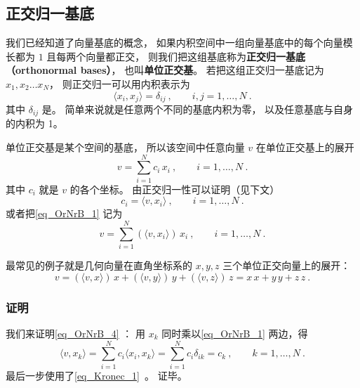 
\begin{issues}
\issueTODO
\end{issues}



\subsection{正交归一基底}

我们已经知道了向量基底的概念， 如果内积空间中一组向量基底中的每个向量模长都为 $1$ 且每两个向量都正交， 则我们把这组基底称为\textbf{正交归一基底（orthonormal bases）}， 也叫\textbf{单位正交基}。 若把这组正交归一基底记为 $x_1, x_2 \dots x_N$， 则正交归一可以用内积表示为
\begin{equation}\label{eq_OrNrB_3}
\langle x_i, x_j \rangle = \delta_{ij} ~,\qquad i,j = 1,\dots, N~.
\end{equation}
其中 $\delta_{ij}$ 是。 简单来说就是任意两个不同的基底内积为零， 以及任意基底与自身的内积为 1。

单位正交基是某个空间的基底， 所以该空间中任意向量 $v$ 在单位正交基上的展开
\begin{equation}\label{eq_OrNrB_1}
v = \sum_{i = 1}^N c_i \, x_i ~,\qquad i = 1, \dots, N~.
\end{equation}
其中 $c_i$ 就是 $v$ 的各个坐标。 由正交归一性可以证明（见下文）
\begin{equation}\label{eq_OrNrB_4}
c_i = \langle v, x_i \rangle ~,\qquad i = 1, \dots, N~.
\end{equation}
或者把\autoref{eq_OrNrB_1} 记为
\begin{equation}\label{eq_OrNrB_5}
v = \sum_{i = 1}^N (\langle v, x_i \rangle) \, x_i~, \qquad i = 1, \dots, N~.
\end{equation}

最常见的例子就是几何向量在直角坐标系的 $x, y, z$ 三个单位正交向量上的展开：
\begin{equation}
v = (\langle v, x \rangle)\, x + (\langle v, y \rangle)\, y + (\langle v, z \rangle)\, z = x \, x + y \, y + z \, z~.
\end{equation} 

\subsubsection{证明}
我们来证明\autoref{eq_OrNrB_4} ： 用 $x_k$ 同时乘以\autoref{eq_OrNrB_1} 两边，得
\begin{equation}\label{eq_OrNrB_2}
\langle v, x_k \rangle = \sum_{i = 1}^N c_i \langle x_i, x_k \rangle = \sum_{i = 1}^N c_i \delta_{ik} = c_k ~,\qquad k = 1, \dots, N~.
\end{equation}
最后一步使用了\autoref{eq_Kronec_1}~。 证毕。

